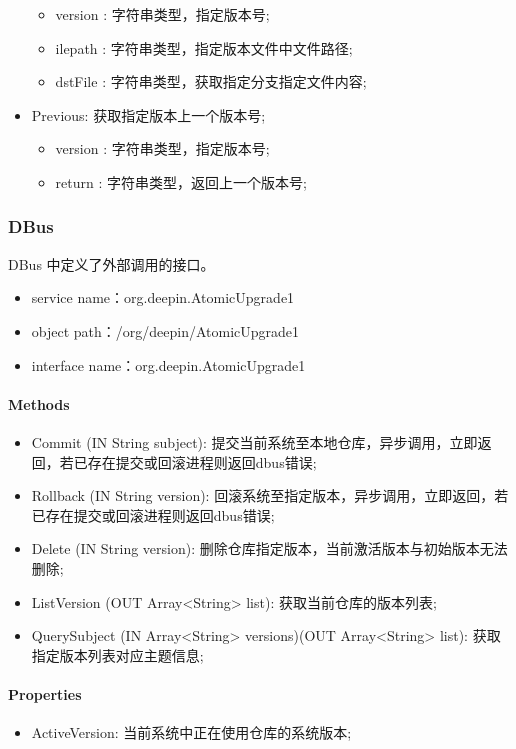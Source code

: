 \documentclass{utart}
\begin{document}
\begin{itemize}[leftmargin=4em]
\begin{itemize}[leftmargin=4em]
    \item version : 字符串类型，指定版本号;
    \item ilepath : 字符串类型，指定版本文件中文件路径;
    \item dstFile : 字符串类型，获取指定分支指定文件内容;
  \end{itemize} 
  \item Previous: 获取指定版本上一个版本号;
  \begin{itemize}[leftmargin=4em]
    \item version : 字符串类型，指定版本号;
    \item return : 字符串类型，返回上一个版本号;
  \end{itemize} 
\end{itemize}

\subsubsection{DBus}
DBus 中定义了外部调用的接口。 
\begin{itemize}[leftmargin=4em]
  \item service name：org.deepin.AtomicUpgrade1
  \item object path：/org/deepin/AtomicUpgrade1
  \item interface name：org.deepin.AtomicUpgrade1
\end{itemize}

\paragraph{Methods}
\begin{itemize}[leftmargin=4em]
  \item Commit (IN String  subject): 提交当前系统至本地仓库，异步调用，立即返回，若已存在提交或回滚进程则返回dbus错误;
  \item Rollback (IN String  version): 回滚系统至指定版本，异步调用，立即返回，若已存在提交或回滚进程则返回dbus错误;
  \item Delete (IN String  version): 删除仓库指定版本，当前激活版本与初始版本无法删除;
  \item ListVersion (OUT Array<String> list): 获取当前仓库的版本列表;
  \item QuerySubject (IN Array<String> versions)(OUT Array<String> list): 获取指定版本列表对应主题信息;
\end{itemize} 

\paragraph{Properties}
\begin{itemize}[leftmargin=4em]
  \item ActiveVersion: 当前系统中正在使用仓库的系统版本;
\end{itemize}
\end{document}

